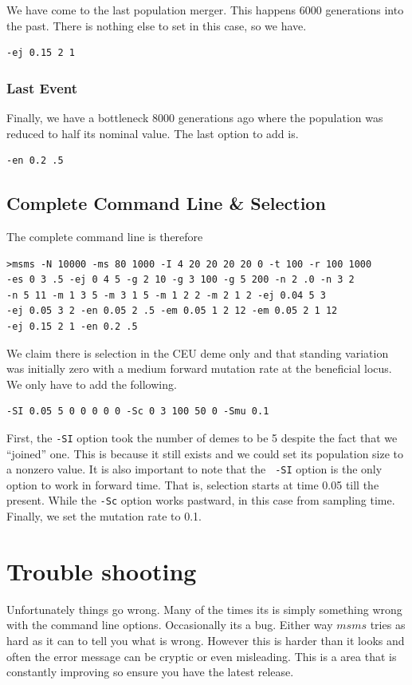 \documentclass{article}
\begin{document}
We have come to the last population merger. This happens 6000 generations
into the past. There is nothing else to set in this case, so we have.
\begin{verbatim}
-ej 0.15 2 1
\end{verbatim}

\subsubsection*{Last Event}

Finally, we have a  bottleneck 8000 generations ago where the population was
reduced to half its nominal value. The last option to add is.
\begin{verbatim}
-en 0.2 .5
\end{verbatim}

\subsection{Complete Command Line \& Selection}
The complete command line is therefore
\begin{verbatim}
>msms -N 10000 -ms 80 1000 -I 4 20 20 20 20 0 -t 100 -r 100 1000 
-es 0 3 .5 -ej 0 4 5 -g 2 10 -g 3 100 -g 5 200 -n 2 .0 -n 3 2 
-n 5 11 -m 1 3 5 -m 3 1 5 -m 1 2 2 -m 2 1 2 -ej 0.04 5 3
-ej 0.05 3 2 -en 0.05 2 .5 -em 0.05 1 2 12 -em 0.05 2 1 12 
-ej 0.15 2 1 -en 0.2 .5
\end{verbatim}
We claim there is selection in the CEU deme only and that standing variation was
initially zero with a medium forward mutation rate at the beneficial locus. We only
have to add the following.
\begin{verbatim}
-SI 0.05 5 0 0 0 0 0 -Sc 0 3 100 50 0 -Smu 0.1
\end{verbatim}
First, the {\tt -SI} option took the number of demes to be 5 despite the fact
that we ``joined'' one. This is because it still exists and we could set its
population size to a nonzero value. It is also important to note that the {\tt
-SI} option is the only option to work in forward time. That is, selection
starts at time 0.05 till the present. While the {\tt -Sc} option works
pastward, in this case from sampling time. Finally, we set the mutation rate to
0.1. 

\section{Trouble shooting}
Unfortunately things go wrong. Many of the times its is simply something wrong
with the command line options. Occasionally its a bug. Either way $msms$ tries as
hard as it can to tell you what is wrong. However this is harder than it looks
and often the error message can be cryptic or even misleading. This is a area
that is constantly improving so ensure you have the latest release. 
\end{document}
